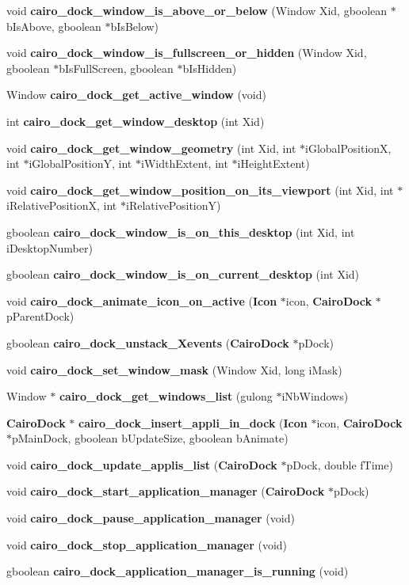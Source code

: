 \begin{CompactItemize}
\item 
void {\bf cairo\_\-dock\_\-window\_\-is\_\-above\_\-or\_\-below} (Window Xid, gboolean $\ast$bIsAbove, gboolean $\ast$bIsBelow)
\item 
void {\bf cairo\_\-dock\_\-window\_\-is\_\-fullscreen\_\-or\_\-hidden} (Window Xid, gboolean $\ast$bIsFullScreen, gboolean $\ast$bIsHidden)
\item 
Window {\bf cairo\_\-dock\_\-get\_\-active\_\-window} (void)
\item 
int {\bf cairo\_\-dock\_\-get\_\-window\_\-desktop} (int Xid)
\item 
void {\bf cairo\_\-dock\_\-get\_\-window\_\-geometry} (int Xid, int $\ast$iGlobalPositionX, int $\ast$iGlobalPositionY, int $\ast$iWidthExtent, int $\ast$iHeightExtent)
\item 
void {\bf cairo\_\-dock\_\-get\_\-window\_\-position\_\-on\_\-its\_\-viewport} (int Xid, int $\ast$iRelativePositionX, int $\ast$iRelativePositionY)
\item 
gboolean {\bf cairo\_\-dock\_\-window\_\-is\_\-on\_\-this\_\-desktop} (int Xid, int iDesktopNumber)
\item 
gboolean {\bf cairo\_\-dock\_\-window\_\-is\_\-on\_\-current\_\-desktop} (int Xid)
\item 
void {\bf cairo\_\-dock\_\-animate\_\-icon\_\-on\_\-active} ({\bf Icon} $\ast$icon, {\bf CairoDock} $\ast$pParentDock)
\item 
gboolean {\bf cairo\_\-dock\_\-unstack\_\-Xevents} ({\bf CairoDock} $\ast$pDock)
\item 
void {\bf cairo\_\-dock\_\-set\_\-window\_\-mask} (Window Xid, long iMask)
\item 
Window $\ast$ {\bf cairo\_\-dock\_\-get\_\-windows\_\-list} (gulong $\ast$iNbWindows)
\item 
{\bf CairoDock} $\ast$ {\bf cairo\_\-dock\_\-insert\_\-appli\_\-in\_\-dock} ({\bf Icon} $\ast$icon, {\bf CairoDock} $\ast$pMainDock, gboolean bUpdateSize, gboolean bAnimate)
\item 
void {\bf cairo\_\-dock\_\-update\_\-applis\_\-list} ({\bf CairoDock} $\ast$pDock, double fTime)
\item 
void {\bf cairo\_\-dock\_\-start\_\-application\_\-manager} ({\bf CairoDock} $\ast$pDock)
\item 
void {\bf cairo\_\-dock\_\-pause\_\-application\_\-manager} (void)
\item 
void {\bf cairo\_\-dock\_\-stop\_\-application\_\-manager} (void)
\item 
gboolean {\bf cairo\_\-dock\_\-application\_\-manager\_\-is\_\-running} (void)
\end{CompactItemize}


